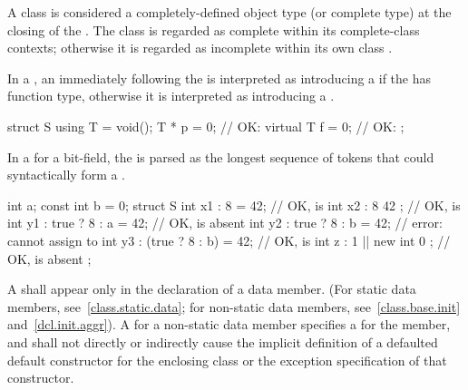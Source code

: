 \pnum
A class is considered a completely-defined object
type (or complete type) at the closing \tcode{\}} of
the .
The class is regarded as complete within its complete-class contexts;
otherwise it is regarded as incomplete within its own class
.

\pnum
In a ,
an \tcode{=} immediately following the 
is interpreted as introducing a 
if the  has function type,
otherwise it is interpreted as introducing
a .
\begin{example}
\begin{codeblock}
struct S {
  using T = void();
  T * p = 0;        // OK: 
  virtual T f = 0;  // OK: 
};
\end{codeblock}
\end{example}

\pnum
In a  for a bit-field,
the  is parsed as
the longest sequence of tokens
that could syntactically form a .
\begin{example}
\begin{codeblock}
int a;
const int b = 0;
struct S {
  int x1 : 8 = 42;               // OK,  is 
  int x2 : 8 { 42 };             // OK,  is 
  int y1 : true ? 8 : a = 42;    // OK,  is absent
  int y2 : true ? 8 : b = 42;    // error: cannot assign to 
  int y3 : (true ? 8 : b) = 42;  // OK,  is 
  int z : 1 || new int { 0 };    // OK,  is absent
};
\end{codeblock}
\end{example}

\pnum
A  shall appear only in the
declaration of a data member. (For static data members,
see~\ref{class.static.data}; for non-static data members,
see~\ref{class.base.init} and~\ref{dcl.init.aggr}).
A  for a non-static data member
%
specifies a  for the member, and
shall not directly or indirectly cause the implicit definition of a
defaulted default constructor for the enclosing class or the
exception specification of that constructor.

